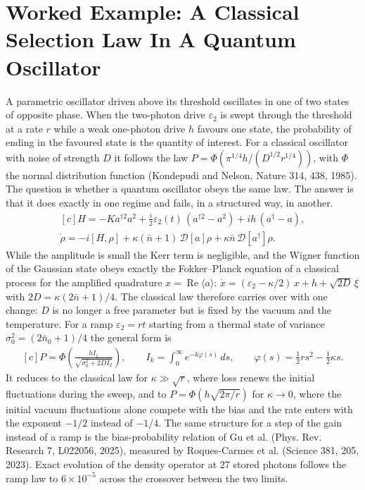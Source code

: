 \documentclass[11pt,oneside]{book}
\newenvironment{centeredalign}{\[\begin{gathered}[c]}{\end{gathered}\]}
\begin{document}
\section{Worked Example: A Classical Selection Law In A Quantum Oscillator}
A parametric oscillator driven above its threshold oscillates in one of two states of opposite phase. When the
two-photon drive \(\varepsilon_2\) is swept through the threshold at a rate \(r\) while a weak one-photon drive \(h\)
favours one state, the probability of ending in the favoured state is the quantity of interest. For a classical
oscillator with noise of strength \(D\) it follows the law \(P=\Phi(\pi^{1/4}h/(D^{1/2}r^{1/4}))\), with \(\Phi\) the
normal distribution function (Kondepudi and Nelson, Nature 314, 438, 1985). The question is whether a quantum oscillator
obeys the same law. The answer is that it does exactly in one regime and fails, in a structured way, in another.
\begin{centeredalign}
H=-Ka^{\dagger2}a^{2}+\tfrac{i}{2}\varepsilon_2(t)\,(a^{\dagger2}-a^{2})+ih\,(a^{\dagger}-a),\\
\dot\rho=-i[H,\rho]+\kappa(\bar n+1)\,\mathcal D[a]\rho+\kappa\bar n\,\mathcal D[a^{\dagger}]\rho.
\end{centeredalign}
While the amplitude is small the Kerr term is negligible, and the Wigner function of the Gaussian state obeys exactly the
Fokker--Planck equation of a classical process for the amplified quadrature \(x=\operatorname{Re}\langle a\rangle\):
\(\dot x=(\varepsilon_2-\kappa/2)\,x+h+\sqrt{2D}\,\xi\) with \(2D=\kappa(2\bar n+1)/4\). The classical law therefore
carries over with one change: \(D\) is no longer a free parameter but is fixed by the vacuum and the temperature. For a
ramp \(\varepsilon_2=rt\) starting from a thermal state of variance \(\sigma_0^2=(2\bar n_0+1)/4\) the general form is
\begin{centeredalign}
P=\Phi\!\left(\frac{hI_1}{\sqrt{\sigma_0^2+2DI_2}}\right),\qquad I_k=\int_0^{\infty}e^{-k\varphi(s)}\,ds,\qquad \varphi(s)=\tfrac12 rs^{2}-\tfrac12\kappa s .
\end{centeredalign}
It reduces to the classical law for \(\kappa\gg\sqrt r\), where loss renews the initial fluctuations during the sweep, and
to \(P=\Phi(h\sqrt{2\pi/r})\) for \(\kappa\to0\), where the initial vacuum fluctuations alone compete with the bias and the
rate enters with the exponent \(-1/2\) instead of \(-1/4\). The same structure for a step of the gain instead of a ramp is
the bias-probability relation of Gu et al. (Phys. Rev. Research 7, L022056, 2025), measured by Roques-Carmes et al.
(Science 381, 205, 2023). Exact evolution of the density operator at 27 stored photons follows the ramp law to
\(6\times10^{-5}\) across the crossover between the two limits.
\end{document}
